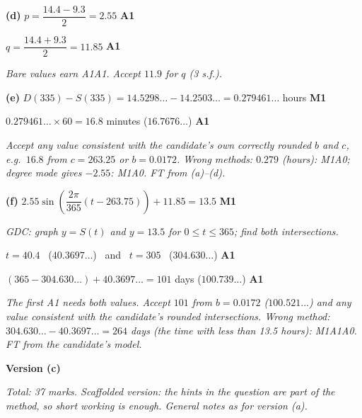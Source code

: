 \documentclass[12pt, twoside]{article}
\begin{document}
\begin{enumerate}[itemsep=0.3cm]
\textbf{(d)} $p = \dfrac{14.4 - 9.3}{2} = 2.55$ \hfill \textbf{A1}

$q = \dfrac{14.4 + 9.3}{2} = 11.85$ \hfill \textbf{A1}

\emph{Bare values earn A1A1. Accept $11.9$ for $q$ (3 s.f.).}

\textbf{(e)} $D(335) - S(335) = 14.5298\ldots - 14.2503\ldots = 0.279461\ldots$
hours \hfill \textbf{M1}

$0.279461\ldots \times 60 = 16.8$ minutes \quad ($16.7676\ldots$)
\hfill \textbf{A1}

\emph{Accept any value consistent with the candidate's own correctly rounded
$b$ and $c$, e.g.\ $16.8$ from $c = 263.25$ or $b = 0.0172$. Wrong
methods: $0.279$ (hours): M1A0; degree mode gives $-2.55$: M1A0. FT from
(a)--(d).}

\newpage

\textbf{(f)} $2.55\sin\!\left(\dfrac{2\pi}{365}(t - 263.75)\right) + 11.85
= 13.5$ \hfill \textbf{M1}

\textit{GDC: graph $y = S(t)$ and $y = 13.5$ for $0 \le t \le 365$; find both
intersections.}

$t = 40.4$ \ ($40.3697\ldots$) \ and \ $t = 305$ \ ($304.630\ldots$)
\hfill \textbf{A1}

$(365 - 304.630\ldots) + 40.3697\ldots = 101$ days \quad ($100.739\ldots$)
\hfill \textbf{A1}

\emph{The first A1 needs both values. Accept $101$ from $b = 0.0172$
($100.521\ldots$) and any value consistent with the candidate's rounded
intersections. Wrong method: $304.630\ldots - 40.3697\ldots = 264$ days
(the time with \emph{less} than 13.5 hours): M1A1A0. FT from the
candidate's model.}

\end{enumerate}

\newpage

\textbf{\large Version (c)}

\emph{Total: 37 marks. Scaffolded version: the hints in the question are
part of the method, so short working is enough. General notes as for
version (a).}
\end{document}
